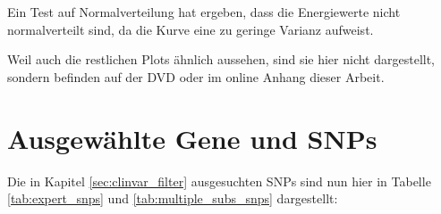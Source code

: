 Ein Test auf Normalverteilung  hat ergeben, dass die Energiewerte nicht normalverteilt sind, da die Kurve eine zu geringe Varianz aufweist. 

Weil auch die restlichen Plots ähnlich aussehen, sind sie hier nicht dargestellt, sondern befinden auf der DVD oder im online Anhang dieser Arbeit.



\section{Ausgewählte Gene und SNPs}
Die in Kapitel \ref{sec:clinvar_filter} ausgesuchten \ac{SNP}s sind nun hier in Tabelle \ref{tab:expert_snps} und \ref{tab:multiple_subs_snps} dargestellt:

\begin{table}[H]
    \centering
    \caption{Tabelle aller Gene des \emph{expert panels} mit mindestens 10 pathogenen \ac{SNP}s. Die verwendeten Gene sind grün markiert.}
    \label{tab:expert_snps}
\end{table}

